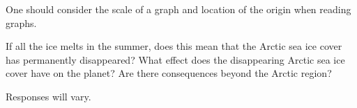 \begin{problem}
\begin{subproblem}
\begin{shortsolution}
																
		One should consider the scale of a graph and location of the origin when reading graphs.  
	\end{shortsolution}
\end{subproblem}
\begin{subproblem}
	If all the ice melts in the summer, does this mean that the Arctic sea ice cover has permanently disappeared?  What effect does the disappearing Arctic sea ice cover have on the planet?  Are there consequences beyond the Arctic region?
	\begin{shortsolution}
		Responses will vary.
	\end{shortsolution}
\end{subproblem}

\end{problem}


